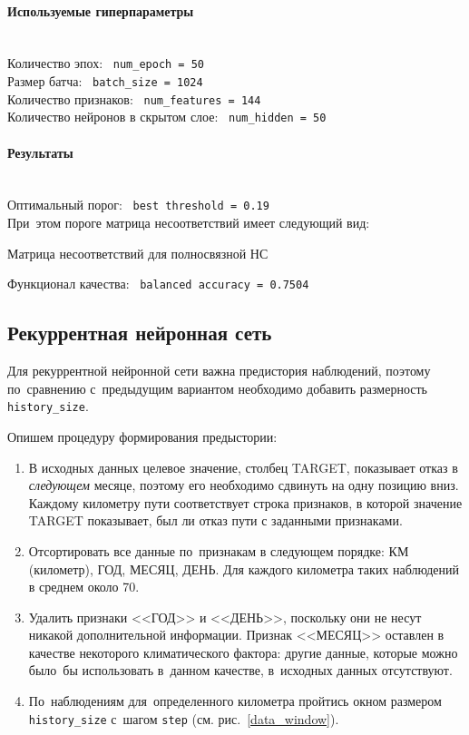 \vspace{-2ex}
\paragraph{Используемые гиперпараметры}~\\
Количество эпох: \ \texttt{num\_epoch = 50}\\
Размер батча: \ \texttt{batch\_size = 1024}\\
Количество признаков: \ \texttt{num\_features = 144}\\
Количество нейронов в скрытом слое: \ \texttt{num\_hidden = 50}

\vspace{-2ex}
\paragraph{Результаты}~\\
Оптимальный порог: \ \texttt{best\ threshold = 0.19}\\
При~этом пороге матрица несоответствий имеет следующий вид:

\begin{table}[!h]
	\centering
	\caption{Матрица несоответствий для полносвязной НС}\medskip
	
	\label{FFNN_conf_mtrx}
\end{table}

\noindent
Функционал качества: \ \texttt{balanced\ accuracy = 0.7504}

\subsection{Рекуррентная нейронная сеть}

Для рекуррентной нейронной сети важна предистория наблюдений, поэтому по~сравнению с~предыдущим вариантом необходимо добавить размерность \texttt{history\_size}.

Опишем процедуру формирования предыстории:
\begin{enumerate}[wide]
		\item В исходных данных целевое значение, столбец TARGET, показывает отказ в \textit{следующем} месяце, 
		поэтому	его необходимо сдвинуть на одну позицию вниз. Каждому километру пути соответствует строка признаков, в которой значение TARGET показывает,
		был ли отказ пути с заданными признаками.
		
		\item Отсортировать все данные по~признакам в следующем порядке: КМ (километр), ГОД, МЕСЯЦ, ДЕНЬ. Для
		каждого километра таких наблюдений в среднем около 70.
		
		\item Удалить признаки <<ГОД>> и <<ДЕНЬ>>, поскольку они не несут никакой дополнительной информации.
		Признак <<МЕСЯЦ>> оставлен в качестве некоторого климатического фактора: другие данные, которые можно было~бы использовать в~данном качестве, в~исходных данных отсутствуют.
		
		\item По~наблюдениям для~определенного километра пройтись окном размером \texttt{history\_size}
		с~шагом \texttt{step} (см. рис.~\ref{data_window}).
\end{enumerate}

